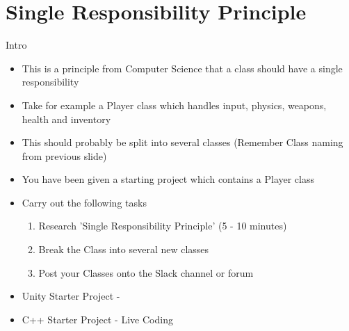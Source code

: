 \part{Single Responsibility Principle}
\frame{\partpage}

\begin{frame}{Intro}
	\begin{itemize}
		\pause \item This is a principle from Computer Science that a class should have a single responsibility
		\pause \item Take for example a Player class which handles input, physics, weapons, health and inventory
		\pause \item This should probably be split into several classes (Remember Class naming from previous slide)
	\end{itemize}
\end{frame}

\begin{frame}
	\begin{itemize}
		\pause \item You have been given a starting project which contains a Player class
		\pause \item Carry out the following tasks
		\begin{enumerate}
			\pause \item Research 'Single Responsibility Principle' (5 - 10 minutes)
			\pause \item Break the Class into several new classes
			\pause \item Post your Classes onto the Slack channel or forum  
		\end{enumerate} 
		\pause \item Unity Starter Project - \url{}
		\pause \item C++ Starter Project - Live Coding
	\end{itemize}
\end{frame}